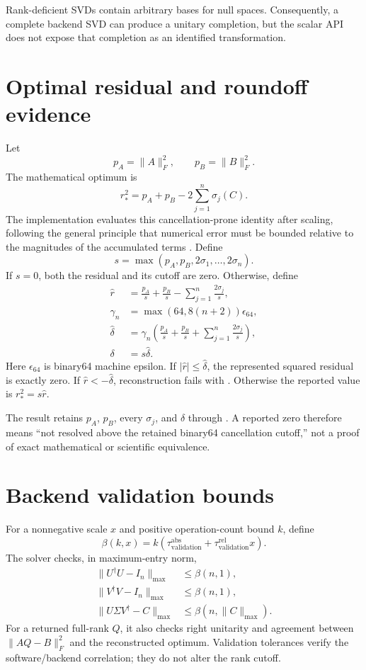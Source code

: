 Rank-deficient SVDs contain arbitrary bases for null spaces. Consequently, a complete
backend SVD can produce a unitary completion, but the scalar API does not expose that
completion as an identified transformation.

\section{Optimal residual and roundoff evidence}
Let
\[
  p_A=\lVert A\rVert_F^2,
  \qquad p_B=\lVert B\rVert_F^2.
\]
The mathematical optimum is
\[
  r_*^2=p_A+p_B-2\sum_{j=1}^{n}\sigma_j(C).
\]
The implementation evaluates this cancellation-prone identity after scaling, following
the general principle that numerical error must be bounded relative to the magnitudes of
the accumulated terms \cite{Higham2002Accuracy}. Define
\[
  s=\max\!\left(p_A,p_B,2\sigma_1,\ldots,2\sigma_n\right).
\]
If $s=0$, both the residual and its cutoff are zero. Otherwise, define
\begin{align*}
  \widehat r &=
    \frac{p_A}{s}+\frac{p_B}{s}
    -\sum_{j=1}^{n}\frac{2\sigma_j}{s},\\
  \gamma_n &= \max\!\left(64,8(n+2)\right)\epsilon_{64},\\
  \widehat\delta &= \gamma_n\left(
    \frac{p_A}{s}+\frac{p_B}{s}
    +\sum_{j=1}^{n}\frac{2\sigma_j}{s}\right),\\
  \delta &= s\widehat\delta.
\end{align*}
Here $\epsilon_{64}$ is binary64 machine epsilon. If
$|\widehat r|\le\widehat\delta$, the represented squared residual is exactly zero. If
$\widehat r<-\widehat\delta$, reconstruction fails with .
Otherwise the reported value is $r_*^2=s\widehat r$.

The result retains $p_A$, $p_B$, every $\sigma_j$, and $\delta$ through
. A reported zero therefore means ``not resolved
above the retained binary64 cancellation cutoff,'' not a proof of exact mathematical or
scientific equivalence.

\section{Backend validation bounds}
For a nonnegative scale $x$ and positive operation-count bound $k$, define
\[
  \beta(k,x)=k\left(
    \tau_{\mathrm{validation}}^{\mathrm{abs}}
    +\tau_{\mathrm{validation}}^{\mathrm{rel}}x
  \right).
\]
The solver checks, in maximum-entry norm,
\begin{align*}
  \lVert U^\dagger U-I_n\rVert_{\max} &\le \beta(n,1),\\
  \lVert V^\dagger V-I_n\rVert_{\max} &\le \beta(n,1),\\
  \lVert U\Sigma V^\dagger-C\rVert_{\max}
    &\le \beta\!\left(n,\lVert C\rVert_{\max}\right).
\end{align*}
For a returned full-rank $Q$, it also checks right unitarity and agreement between
$\lVert AQ-B\rVert_F^2$ and the reconstructed optimum. Validation tolerances verify the
software/backend correlation; they do not alter the rank cutoff.

